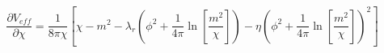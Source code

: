 \begin{equation}
\frac{\partial V_{eff}} {\partial \chi}= \frac{1} {8 \pi \chi} \left[\chi -
m^2 - \lambda_r\left(\phi^2
+\frac{1}{4 \pi} {\ln} [\frac{m^2}{\chi}] \right)- \eta \left( \phi^2
+\frac{1}{4 \pi}
{\ln} [\frac{m^2}{\chi}] \right)^2  \right]
\end{equation}

